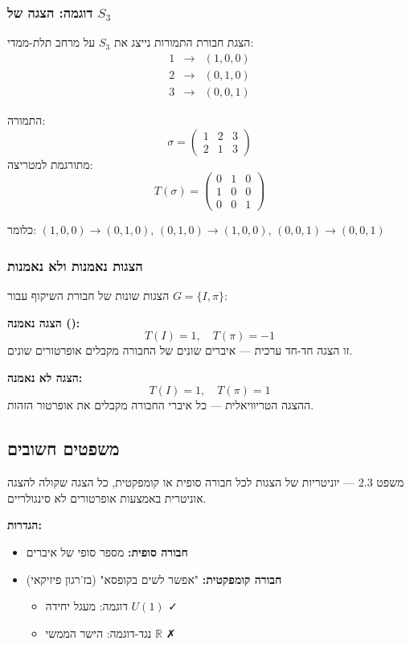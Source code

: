 \subsubsection*{דוגמה: הצגה של $S_3$}

\begin{examplebox}{הצגת חבורת התמורות}
נייצג את $S_3$ על מרחב תלת-ממדי:
\[
\begin{array}{rcl}
1 &\to& (1, 0, 0) \\
2 &\to& (0, 1, 0) \\
3 &\to& (0, 0, 1)
\end{array}
\]

התמורה:
\[
\sigma = \begin{pmatrix} 1 & 2 & 3 \\ 2 & 1 & 3 \end{pmatrix}
\]
מתורגמת למטריצה:
\[
T(\sigma) = \begin{pmatrix} 
0 & 1 & 0 \\ 
1 & 0 & 0 \\ 
0 & 0 & 1 
\end{pmatrix}
\]

כלומר: $(1,0,0) \to (0,1,0)$, $(0,1,0) \to (1,0,0)$, $(0,0,1) \to (0,0,1)$
\end{examplebox}

\subsubsection*{הצגות נאמנות ולא נאמנות}

\begin{examplebox}{הצגות שונות של חבורת השיקוף}
עבור $G = \{I, \pi\}$:

    \textbf{הצגה נאמנה ():}
\[
T(I) = 1, \quad T(\pi) = -1
\]
זו הצגה חד-חד ערכית — איברים שונים של החבורה מקבלים אופרטורים שונים.

\textbf{הצגה לא נאמנה:}
\[
T(I) = 1, \quad T(\pi) = 1
\]
ההצגה הטריוויאלית — כל איברי החבורה מקבלים את אופרטור הזהות.
\end{examplebox}

\subsection{משפטים חשובים}

\begin{theorembox}{משפט 2.3 — יוניטריות של הצגות}
לכל חבורה סופית או קומפקטית, כל הצגה שקולה להצגה אוניטרית באמצעות אופרטורים לא סינגולריים.

\textbf{הגדרות:}
\begin{itemize}
    \item \textbf{חבורה סופית:} מספר סופי של איברים
    \item \textbf{חבורה קומפקטית:} "אפשר לשים בקופסא" (בז'רגון פיזיקאי)
    \begin{itemize}
        \item דוגמה: מעגל יחידה $U(1)$ ✓
        \item נגד-דוגמה: הישר הממשי $\mathbb{R}$ ✗
    \end{itemize}
\end{itemize}
\end{theorembox}


